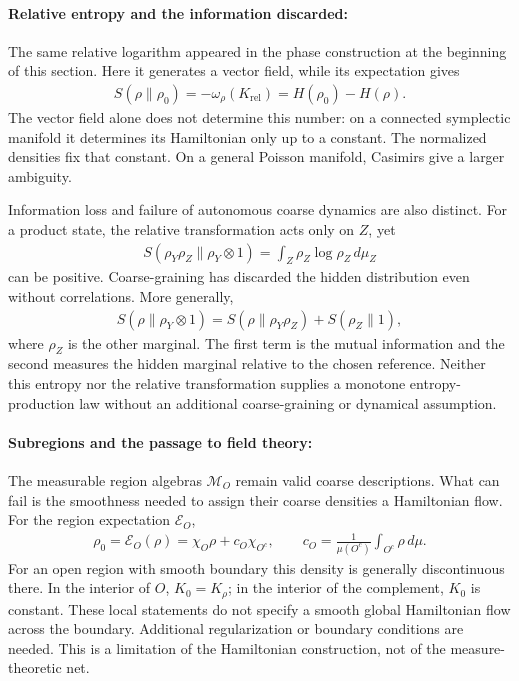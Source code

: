 \documentclass[a4paper,11pt]{article}
\theoremstyle{definition}
\newcommand{\mM}{\mathcal{M}}
\newcommand{\mE}{\mathcal{E}}
\begin{document}
\paragraph{Relative entropy and the information discarded:}
The same relative logarithm appeared in the phase construction at the beginning of this section. Here it generates a vector field, while its expectation gives
\begin{align}\label{eq:classical-relative-entropy-Hamiltonian}
    S(\rho\|\rho_0)=-\omega_\rho(K_{\mathrm{rel}})
    =H(\rho_0)-H(\rho).
\end{align}
The vector field alone does not determine this number: on a connected symplectic manifold it determines its Hamiltonian only up to a constant. The normalized densities fix that constant. On a general Poisson manifold, Casimirs give a larger ambiguity.

Information loss and failure of autonomous coarse dynamics are also distinct. For a product state, the relative transformation acts only on $Z$, yet
\begin{align}
    S(\rho_Y\rho_Z\|\rho_Y\otimes1)
    =\int_Z\rho_Z\log\rho_Z\,d\mu_Z
\end{align}
can be positive. Coarse-graining has discarded the hidden distribution even without correlations. More generally,
\begin{align}
    S(\rho\|\rho_Y\otimes1)
    =S(\rho\|\rho_Y\rho_Z)+S(\rho_Z\|1),
\end{align}
where $\rho_Z$ is the other marginal. The first term is the mutual information and the second measures the hidden marginal relative to the chosen reference. Neither this entropy nor the relative transformation supplies a monotone entropy-production law without an additional coarse-graining or dynamical assumption.

\paragraph{Subregions and the passage to field theory:}
The measurable region algebras $\mM_O$ remain valid coarse descriptions. What can fail is the smoothness needed to assign their coarse densities a Hamiltonian flow. For the region expectation $\mE_O$,
\begin{align}
    \rho_0=\mE_O(\rho)=\chi_O\rho+c_O\chi_{O^c},\qquad
    c_O=\frac{1}{\mu(O^c)}\int_{O^c}\rho\,d\mu.
\end{align}
For an open region with smooth boundary this density is generally discontinuous there. In the interior of $O$, $K_0=K_\rho$; in the interior of the complement, $K_0$ is constant. These local statements do not specify a smooth global Hamiltonian flow across the boundary. Additional regularization or boundary conditions are needed. This is a limitation of the Hamiltonian construction, not of the measure-theoretic net.
\end{document}
